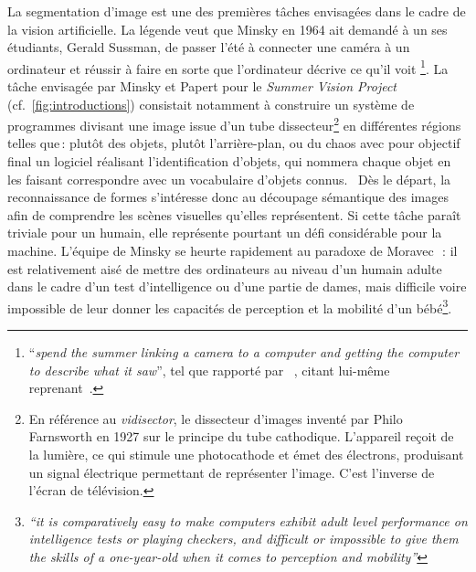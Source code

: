 La segmentation d'image est une des premières tâches envisagées dans le cadre de la vision artificielle.
La légende veut que Minsky en 1964 ait demandé à un ses étudiants, Gerald Sussman, de \og passer l'été à connecter une caméra à un ordinateur et réussir à faire en sorte que l'ordinateur décrive ce qu'il voit \fg\footnote{``\emph{spend the summer linking a camera to a computer and getting the computer to describe what it saw}'', tel que rapporté par ~\citet{szeliski_computer_2011}, citant lui-même~\citet{boden_mind_2008} reprenant~\citet{crevier_ai_1993}.}.
La tâche envisagée par Minsky et Papert pour le \emph{Summer Vision Project} (cf.~\cref{fig:introductions}) consistait notamment à \og construire un système de programmes divisant une image issue d'un tube dissecteur\footnote{En référence au \emph{vidisector}, le dissecteur d'images inventé par Philo Farnsworth en 1927 sur le principe du tube cathodique. L'appareil reçoit de la lumière, ce qui stimule une photocathode et émet des électrons, produisant un signal électrique permettant de représenter l'image. C'est l'inverse de l'écran de télévision.} en différentes régions telles que\,: plutôt des objets, plutôt l'arrière-plan, ou du chaos\fg{} avec pour objectif final un logiciel réalisant \og l'identification d'objets, qui nommera chaque objet en les faisant correspondre avec un vocabulaire d'objets connus.\fg{}~\cite{papert_summer_1966}
Dès le départ, la reconnaissance de formes s'intéresse donc au découpage sémantique des images afin de comprendre les scènes visuelles qu'elles représentent.
Si cette tâche paraît triviale pour un humain, elle représente pourtant un défi considérable pour la machine. L'équipe de Minsky se heurte rapidement au paradoxe de Moravec~\cite{moravec_mind_1988}\,: \og il est relativement aisé de mettre des ordinateurs au niveau d'un humain adulte dans le cadre d'un test d'intelligence ou d'une partie de dames, mais difficile voire impossible de leur donner les capacités de perception et la mobilité d'un bébé\fg{}\footnote{\emph{``it is comparatively easy to make computers exhibit adult level performance on intelligence tests or playing checkers, and difficult or impossible to give them the skills of a one-year-old when it comes to perception and mobility''}}.

